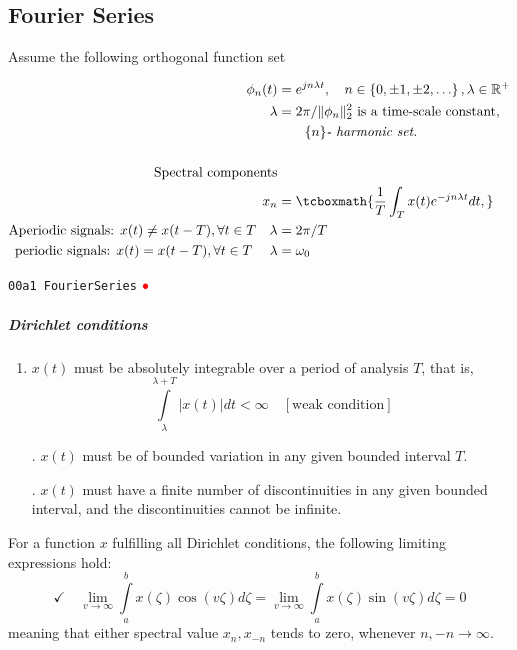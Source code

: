 \documentclass[17pt,a4paper]{extarticle}
\newcommand{\Real}{\mathbb{R}}\newcommand{\N}{\mathbb{N}}
\newcommand{\gc}[1]{\textcolor[rgb]{1.00,0.00,0.00}{#1}}
\newcommand{\alp}[1]{\textcolor[rgb]{0.00,0.00,1.00}{\small\texttt{#1}}}
\begin{document}
\subsection*{Fourier Series}
Assume the following orthogonal function set
\begin{linenomath*}
\begin{align*}
	\phi_{n}(t)&=e^{jn\lambda t}, \quad n\in\left\{ 0,\pm1,\pm2,\ldots\right\}, \lambda\in \Real^{+}\\
\lambda &= 2\pi/\|\phi_{n}\|^{2} _2 \textrm{ is a time-scale constant,}\\
& \qquad\{n\} \textit{- harmonic set.} \\ \\
\textrm{Spectral components}\\
	{x_{n}}&=\tcboxmath{\frac{1}{T}\int\nolimits_{T}x(t)e^{-jn\lambda t}dt,}\,\\
	\textrm{Aperiodic signals: } x(t)\ne x(t - T), \forall t\in T\quad \lambda&=2\pi/ T\\	
	\textrm{periodic signals: } x(t)= x(t - T), \forall t\in T \quad \; \lambda&=\omega_0 	
\end{align*}
\end{linenomath*}
	\alp{00a1 FourierSeries} \href{https://deepnote.com/workspace/gcpds-76307f69-c109-4b50-8818-29b8600ffe98/project/Fundamentals-ef1064c8-5ffe-4039-a3f4-6f71bb3de118/notebook/00a1%20FourierSeries-71aed2d7ceb94098988500406eafa9dd}{$\gc{\bullet}$} 

\clearpage
\subparagraph{\textit{Dirichlet conditions}}

\begin{enumerate}
	\renewcommand{\labelenumi}
	{\alph{enumi}).}
	\item $x(t)$ must be absolutely integrable over a period of analysis $T$, that is,%
	\begin{displaymath}{{\displaystyle\int\limits_{\lambda}^{\lambda+T}}
		\left\vert x(t)\right\vert dt<\infty }\quad [\textrm{weak condition}]
	\end{displaymath}
\item[.] $x(t)$ must be of bounded variation in any given bounded interval
$T$.
\item[.] $x(t)$ must have a finite number of discontinuities in any given bounded interval, and the discontinuities cannot be infinite.
\end{enumerate}

For a function $x$ fulfilling all Dirichlet conditions, the following limiting expressions hold:
\begin{displaymath}{
	\checkmark\quad	\lim_{v\rightarrow\infty}{\displaystyle\int\limits_{a}^{b}}
		x(\zeta)\cos(v\zeta)d\zeta=\lim_{v\rightarrow\infty}{\displaystyle\int\limits_{a}^{b}}
		x(\zeta)\sin(v\zeta)d\zeta=0 
	}
 \end{displaymath}
	meaning that either spectral value $x_n,x_{-n}$ tends to zero, whenever $n,-n\rightarrow\infty$.
 
\end{document}
